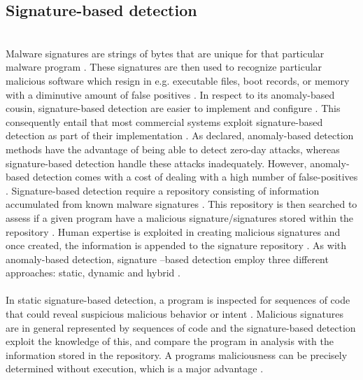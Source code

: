 \documentclass[12pt]{article} %
\begin{document}
\subsection{Signature-based detection}
\\
Malware signatures are strings of bytes that are unique for that particular malware program \cite{ye2007imds}. These signatures are then used to recognize particular malicious software which resign in e.g. executable files, boot records, or memory with a diminutive amount of false positives \cite{ye2007imds}. In respect to its anomaly-based cousin, signature-based detection are easier to implement and configure \cite{kruegel2003using}. This consequently entail that most commercial systems exploit signature-based  detection as part of their implementation \cite{kruegel2003using}. As declared, anomaly-based detection methods have the advantage of being able to detect zero-day attacks, whereas signature-based detection handle these attacks inadequately. However, anomaly-based detection comes with a cost of dealing with a high number of false-positives \cite{kruegel2003using}. Signature-based detection require a repository consisting of information accumulated from known malware signatures \cite{kruegel2003using, idika2007survey}. This repository is then searched to assess if a given program have a malicious signature/signatures stored within the repository \cite{idika2007survey}. Human expertise is exploited in creating malicious signatures and once created, the information is appended to the signature repository \cite{idika2007survey}. As with anomaly-based detection, signature –based detection employ three different approaches: static, dynamic and hybrid \cite{idika2007survey}.
\\ \\
In static signature-based detection, a program is inspected for sequences of code that could reveal suspicious malicious behavior or intent \cite{idika2007survey}. Malicious signatures are in general represented by sequences of code and the signature-based detection exploit the knowledge of this, and compare the program in analysis with the information stored in the repository. A programs maliciousness can be precisely determined without execution, which is a major advantage \cite{idika2007survey}. \\
\end{document}
